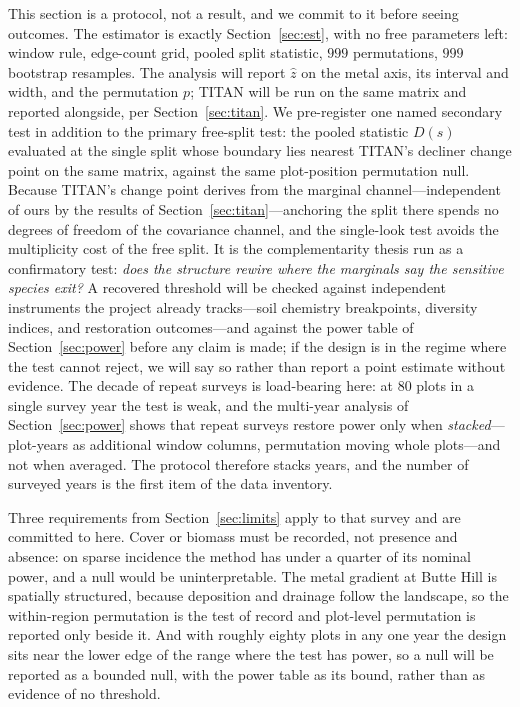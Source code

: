 \documentclass[review,12pt,authoryear]{elsarticle}
\theoremstyle{remark}
\begin{document}
This section is a protocol, not a result, and we commit to it before seeing
outcomes. The estimator is exactly Section~\ref{sec:est}, with no free
parameters left: window rule, edge-count grid, pooled split statistic, $999$
permutations, $999$ bootstrap resamples. The analysis will report $\hat z$ on
the metal axis, its interval and width, and the permutation $p$; TITAN
\citep{baker2010titan} will be run on the same matrix and reported alongside,
per Section~\ref{sec:titan}. We pre-register one named secondary test in
addition to the primary free-split test: the pooled statistic $D(s)$
evaluated at the single split whose boundary lies nearest TITAN's decliner
change point on the same matrix, against the same plot-position permutation
null. Because TITAN's change point derives from the marginal channel---independent of ours by the results of Section~\ref{sec:titan}---anchoring
the split there spends no degrees of freedom of the covariance channel, and
the single-look test avoids the multiplicity cost of the free split. It is
the complementarity thesis run as a confirmatory test: \emph{does the
structure rewire where the marginals say the sensitive species exit?} A recovered threshold will be checked against
independent instruments the project already tracks---soil chemistry
breakpoints, diversity indices, and restoration outcomes---and against the
power table of Section~\ref{sec:power} before any claim is made; if the design
is in the regime where the test cannot reject, we will say so rather than
report a point estimate without evidence. The decade of repeat surveys is
load-bearing here: at 80 plots in a single survey year the test is weak, and
the multi-year analysis of Section~\ref{sec:power} shows that repeat
surveys restore power only when \emph{stacked}---plot-years as additional
window columns, permutation moving whole plots---and not when averaged.
The protocol therefore stacks years, and the number of surveyed years is
the first item of the data inventory.

Three requirements from Section~\ref{sec:limits} apply to that survey and
are committed to here. Cover or biomass must be recorded, not presence and
absence: on sparse incidence the method has under a quarter of its nominal
power, and a null would be uninterpretable. The metal gradient at Butte
Hill is spatially structured, because deposition and drainage follow the
landscape, so the within-region permutation is the test of record and
plot-level permutation is reported only beside it. And with roughly eighty
plots in any one year the design sits near the lower edge of the range
where the test has power, so a null will be reported as a bounded null,
with the power table as its bound, rather than as evidence of no
threshold.
\end{document}
